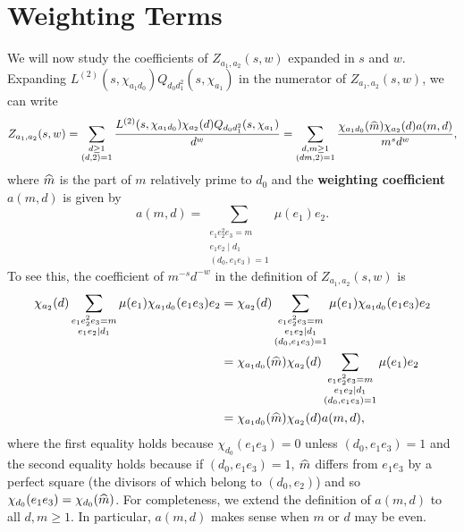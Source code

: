 \documentclass[12pt,reqno,oneside]{amsart}
\begin{document}
\section*{Weighting Terms}
    We will now study the coefficients of $Z_{a_{1},a_{2}}(s,w)$ expanded in $s$ and $w$. Expanding $L^{(2)}(s,\chi_{a_{1}d_{0}})Q_{d_{0}d_{1}^{2}}(s,\chi_{a_{1}})$ in the numerator of $Z_{a_{1},a_{2}}(s,w)$, we can write
    \[
        Z_{a_{1},a_{2}}(s,w) = \sum_{\substack{d \ge 1 \\ (d,2) = 1}}\frac{L^{(2)}(s,\chi_{a_{1}d_{0}})\chi_{a_{2}}(d)Q_{d_{0}d_{1}^{2}}(s,\chi_{a_{1}})}{d^{w}} = \sum_{\substack{d,m \ge 1 \\ (dm,2) = 1}}\frac{\chi_{a_{1}d_{0}}(\widehat{m})\chi_{a_{2}}(d)a(m,d)}{m^{s}d^{w}},
    \]
    where $\widehat{m}$ is the part of $m$ relatively prime to $d_{0}$ and the \textbf{weighting coefficient} $a(m,d)$ is given by
    \[
        a(m,d) = \sum_{\substack{e_{1}e_{2}^{2}e_{3} = m \\ e_{1}e_{2} \mid d_{1} \\ (d_{0},e_{1}e_{3}) = 1}}\mu(e_{1})e_{2}.
    \]
    To see this, the coefficient of $m^{-s}d^{-w}$ in the definition of $Z_{a_{1},a_{2}}(s,w)$ is
    \begin{align*}
        \chi_{a_{2}}(d)\sum_{\substack{e_{1}e_{2}^{2}e_{3} = m \\ e_{1}e_{2} \mid d_{1}}}\mu(e_{1})\chi_{a_{1}d_{0}}(e_{1}e_{3})e_{2} &= \chi_{a_{2}}(d)\sum_{\substack{e_{1}e_{2}^{2}e_{3} = m \\ e_{1}e_{2} \mid d_{1} \\ (d_{0},e_{1}e_{3}) = 1}}\mu(e_{1})\chi_{a_{1}d_{0}}(e_{1}e_{3})e_{2} \\
        &= \chi_{a_{1}d_{0}}(\widehat{m})\chi_{a_{2}}(d)\sum_{\substack{e_{1}e_{2}^{2}e_{3} = m \\ e_{1}e_{2} \mid d_{1} \\ (d_{0},e_{1}e_{3}) = 1}}\mu(e_{1})e_{2} \\
        &= \chi_{a_{1}d_{0}}(\widehat{m})\chi_{a_{2}}(d)a(m,d),
    \end{align*}
    where the first equality holds because $\chi_{d_{0}}(e_{1}e_{3}) = 0$ unless $(d_{0},e_{1}e_{3}) = 1$ and the second equality holds because if $(d_{0},e_{1}e_{3}) = 1$, $\widehat{m}$ differs from $e_{1}e_{3}$ by a perfect square (the divisors of which belong to $(d_{0},e_{2})$) and so $\chi_{d_{0}}(e_{1}e_{3}) = \chi_{d_{0}}(\widehat{m})$. For completeness, we extend the definition of $a(m,d)$ to all $d,m \ge 1$. In particular, $a(m,d)$ makes sense when $m$ or $d$ may be even.
    
\end{document}
